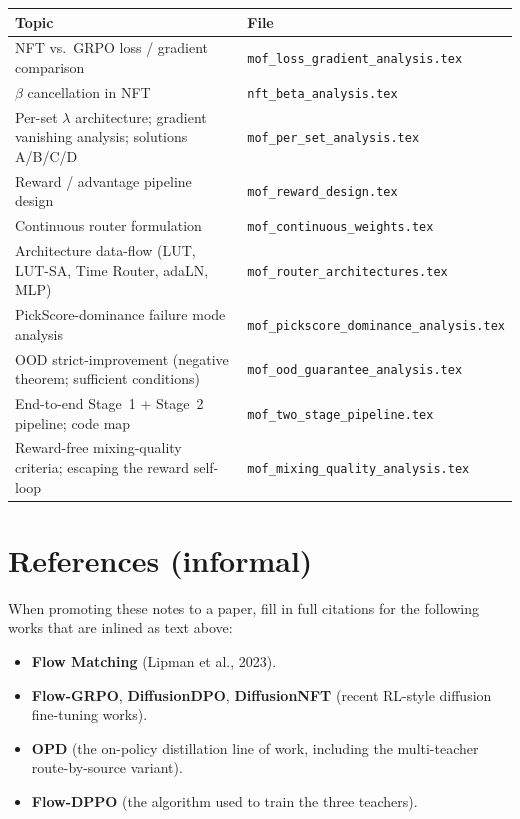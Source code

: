 \documentclass[11pt,a4paper]{article}
\theoremstyle{definition}
\begin{document}
\begin{center}
\renewcommand{\arraystretch}{1.4}
\footnotesize
\begin{tabular}{@{}p{5.5cm}p{8cm}@{}}
\toprule
\textbf{Topic} & \textbf{File} \\
\midrule
NFT vs.\ GRPO loss / gradient comparison &
\texttt{mof\_loss\_gradient\_analysis.tex} \\
$\beta$ cancellation in NFT &
\texttt{nft\_beta\_analysis.tex} \\
Per-set $\lambda$ architecture; gradient vanishing analysis;
solutions A/B/C/D &
\texttt{mof\_per\_set\_analysis.tex} \\
Reward / advantage pipeline design &
\texttt{mof\_reward\_design.tex} \\
Continuous router formulation &
\texttt{mof\_continuous\_weights.tex} \\
Architecture data-flow (LUT, LUT-SA, Time Router, adaLN, MLP) &
\texttt{mof\_router\_architectures.tex} \\
PickScore-dominance failure mode analysis &
\texttt{mof\_pickscore\_dominance\_analysis.tex} \\
OOD strict-improvement (negative theorem; sufficient conditions) &
\texttt{mof\_ood\_guarantee\_analysis.tex} \\
End-to-end Stage~1 + Stage~2 pipeline; code map &
\texttt{mof\_two\_stage\_pipeline.tex} \\
Reward-free mixing-quality criteria; escaping the reward self-loop &
\texttt{mof\_mixing\_quality\_analysis.tex} \\
\bottomrule
\end{tabular}
\end{center}

\section*{References (informal)}
When promoting these notes to a paper, fill in full citations for the
following works that are inlined as text above:
\begin{itemize}[leftmargin=1.5em]
\item \textbf{Flow Matching} (Lipman et al., 2023).
\item \textbf{Flow-GRPO}, \textbf{DiffusionDPO}, \textbf{DiffusionNFT}
(recent RL-style diffusion fine-tuning works).
\item \textbf{OPD} (the on-policy distillation line of work, including
the multi-teacher route-by-source variant).
\item \textbf{Flow-DPPO} (the algorithm used to train the three teachers).
\end{itemize}
\end{document}
